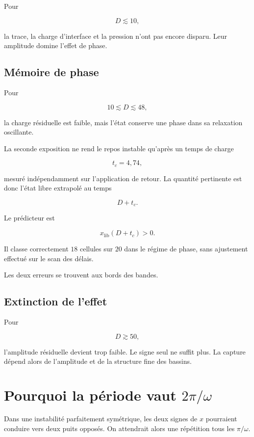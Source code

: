 Pour

\[
D\lesssim10,
\]

la trace, la charge d'interface et la pression n'ont pas encore disparu.
Leur amplitude domine l'effet de phase.

\subsection{Mémoire de phase}\label{t2-memoire-de-phase}

Pour

\[
10\lesssim D\lesssim48,
\]

la charge résiduelle est faible, mais l'état conserve une phase dans sa
relaxation oscillante.

La seconde exposition ne rend le repos instable qu'après un temps de
charge

\[
t_c=4{,}74,
\]

mesuré indépendamment sur l'application de retour. La quantité
pertinente est donc l'état libre extrapolé au temps

\[
D+t_c.
\]

Le prédicteur est

\[
\boxed{
x_{\mathrm{lib}}(D+t_c)>0
}.
\]

Il classe correctement \(18\) cellules sur \(20\) dans le régime de
phase, sans ajustement effectué sur le scan des délais.

Les deux erreurs se trouvent aux bords des bandes.

\subsection{Extinction de l'effet}\label{t2-extinction-de-leffet}

Pour

\[
D\gtrsim50,
\]

l'amplitude résiduelle devient trop faible. Le signe seul ne suffit
plus. La capture dépend alors de l'amplitude et de la structure fine des
bassins.

\section{Pourquoi la période vaut \texorpdfstring{\(2\pi/\omega\)}{2 pi / omega}}\label{t2-pourquoi-la-periode-vaut-2piomega}

Dans une instabilité parfaitement symétrique, les deux signes de \(x\)
pourraient conduire vers deux puits opposés. On attendrait alors une
répétition tous les \(\pi/\omega\).

